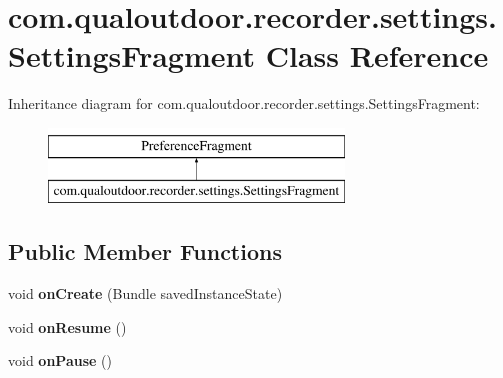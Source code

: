 \hypertarget{classcom_1_1qualoutdoor_1_1recorder_1_1settings_1_1SettingsFragment}{\section{com.\-qualoutdoor.\-recorder.\-settings.\-Settings\-Fragment Class Reference}
\label{classcom_1_1qualoutdoor_1_1recorder_1_1settings_1_1SettingsFragment}
}
Inheritance diagram for com.\-qualoutdoor.\-recorder.\-settings.\-Settings\-Fragment\-:\begin{figure}[H]
\begin{center}
\leavevmode
\includegraphics[height=2.000000cm]{classcom_1_1qualoutdoor_1_1recorder_1_1settings_1_1SettingsFragment}
\end{center}
\end{figure}
\subsection*{Public Member Functions}
\begin{DoxyCompactItemize}
\item 
\hypertarget{classcom_1_1qualoutdoor_1_1recorder_1_1settings_1_1SettingsFragment_a50fbe47e48a83d6b0995d6bc484876dd}{void {\bfseries on\-Create} (Bundle saved\-Instance\-State)}\label{classcom_1_1qualoutdoor_1_1recorder_1_1settings_1_1SettingsFragment_a50fbe47e48a83d6b0995d6bc484876dd}

\item 
\hypertarget{classcom_1_1qualoutdoor_1_1recorder_1_1settings_1_1SettingsFragment_a4b519d89b85d934e9e11c13b77d73e89}{void {\bfseries on\-Resume} ()}\label{classcom_1_1qualoutdoor_1_1recorder_1_1settings_1_1SettingsFragment_a4b519d89b85d934e9e11c13b77d73e89}

\item 
\hypertarget{classcom_1_1qualoutdoor_1_1recorder_1_1settings_1_1SettingsFragment_a72ca5659c27c2bc4b4ea38ce91006d53}{void {\bfseries on\-Pause} ()}\label{classcom_1_1qualoutdoor_1_1recorder_1_1settings_1_1SettingsFragment_a72ca5659c27c2bc4b4ea38ce91006d53}

\end{DoxyCompactItemize}
